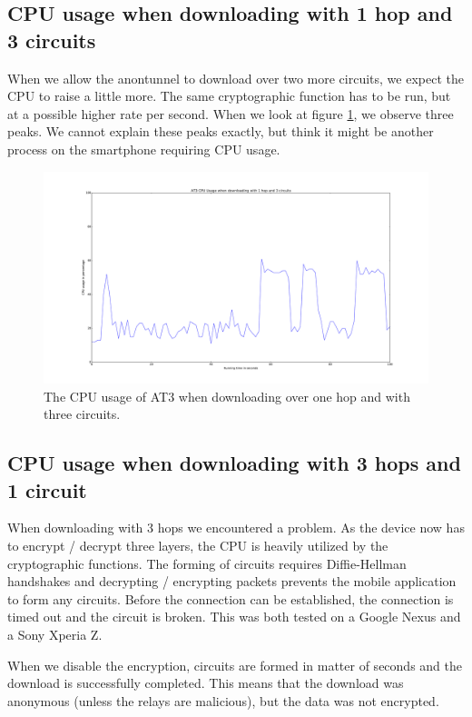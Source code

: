 	\clearpage
	\subsection{CPU usage when downloading with 1 hop and 3 circuits}
		When we allow the anontunnel to download over two more circuits, we expect the CPU to raise a little more. The same cryptographic function has to be run, but at a possible higher rate per second. When we look at figure \ref{fig:cpu_1_hop_3_circuits}, we observe three peaks. We cannot explain these peaks exactly, but think it might be another process on the smartphone requiring CPU usage.
		
		\begin{figure}[!h]
			\centering
			\includegraphics[width=\textwidth]{graphics/cpu_usage_1_hop_3_circuits.pdf}
			\caption{The CPU usage of AT3 when downloading over one hop and with three circuits.}
			\label{fig:cpu_1_hop_3_circuits}
		\end{figure}
		
	\subsection{CPU usage when downloading with 3 hops and 1 circuit}
		\label{ssec:3_hops_1_circuit}
		When downloading with 3 hops we encountered a problem. As the device now has to encrypt / decrypt three layers, the CPU is heavily utilized by the cryptographic functions. The forming of circuits requires Diffie-Hellman handshakes and decrypting / encrypting packets prevents the mobile application to form any circuits. Before the connection can be established, the connection is timed out and the circuit is broken. This was both tested on a Google Nexus and a Sony Xperia Z.
		
		When we disable the encryption, circuits are formed in matter of seconds and the download is successfully completed.
		This means that the download was anonymous (unless the relays are malicious), but the data was not encrypted.
		
